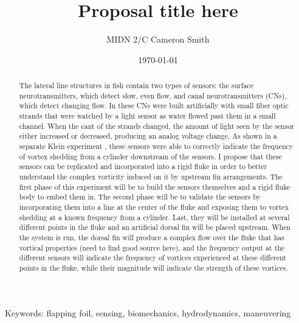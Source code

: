 \documentclass[10pt]{article}
\title{Proposal title here}
\author{MIDN 2/C Cameron Smith}
\date{\today}
\begin{document}
\maketitle

\begin{abstract}
The lateral line structures in fish contain two types of sensors: the surface neurotransmitters, which detect slow, even flow, and canal neurotransmitters (CNs), which detect changing
flow. In \citep{klein2011title} these CNs were built artificially with small fiber optic strands that were watched by a light sensor as water flowed past them in a small channel. When the cant of the strands changed, the amount of light seen by the sensor either increased or decreased, producing an analog voltage change. As shown in a separate Klein experiment \citep{klein2011title}, these sensors were able to correctly indicate the frequency of vortex shedding from a cylinder downstream of the sensors. I propose that these sensors can be replicated and incorporated into a rigid fluke in order to
better understand the complex vorticity induced on it by upstream fin arrangements. The first phase of this experiment will be to build the sensors themselves and a rigid fluke body to embed them in. The second phase will be to validate the sensors by incorporating them into a line at the center of the fluke and exposing them to vortex shedding at a known frequency from a cylinder. Last, they will be installed at several different points in the fluke and an artificial dorsal fin will be placed upstream. When the system is run, the dorsal fin will produce a complex flow over the fluke that has vortical properties (need to find good source here), and the frequency output at the different sensors will indicate the frequency of vortices experienced at these different points in the fluke, while their magnitude will indicate the strength of these vortices.
\end{abstract}


{\scriptsize Keywords: flapping foil, sensing, biomechanics, hydrodynamics, maneuvering}


\end{document}
